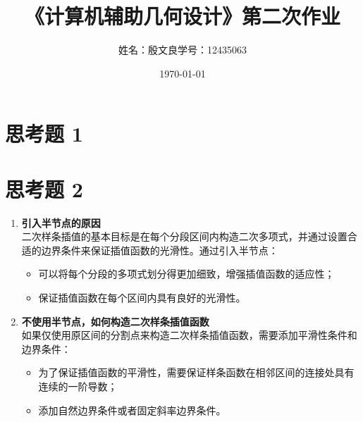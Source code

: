 \documentclass[utf8]{ctexart}
\title{《计算机辅助几何设计》第二次作业}
\author{姓名：殷文良\qquad 学号：12435063}
\date{\today}
\begin{document}
\maketitle
{}

\section*{思考题 1}


\section*{思考题 2}
\begin{enumerate}
    \item \textbf{引入半节点的原因}\\
    二次样条插值的基本目标是在每个分段区间内构造二次多项式，并通过设置合适的边界条件来保证插值函数的光滑性。通过引入半节点：
    \begin{itemize}
        \item 可以将每个分段的多项式划分得更加细致，增强插值函数的适应性；
        \item 保证插值函数在每个区间内具有良好的光滑性。
    \end{itemize}
    \item \textbf{不使用半节点，如何构造二次样条插值函数}\\
    如果仅使用原区间的分割点来构造二次样条插值函数，需要添加平滑性条件和边界条件：
    \begin{itemize}
        \item 为了保证插值函数的平滑性，需要保证样条函数在相邻区间的连接处具有连续的一阶导数；
        \item 添加自然边界条件或者固定斜率边界条件。
    \end{itemize}
\end{enumerate}
\end{document}
